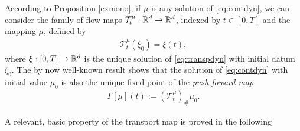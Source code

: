 According to  Proposition \ref{exmono}, if $\mu$ is any solution of \eqref{eq:contdyn}, we can consider the family of flow maps $\mathcal{T}^{\mu}_t:\mathbb{R}^d \rightarrow\mathbb{R}^d$, indexed by $t \in [0,T]$ and the mapping $\mu$, defined by
\begin{align*}
\mathcal{T}^{\mu}_t(\xi_0) = \xi(t),
\end{align*}
where $\xi:[0,T]\rightarrow\mathbb{R}^d$ is the unique solution of \eqref{eq:transpdyn} with initial datum $\xi_0$. The by now well-known result \cite[Theorem 3.10]{CanCarRos10} shows that the solution of \eqref{eq:contdyn} with initial value $\mu_0$ is also the unique fixed-point of the \textit{push-foward map}
\begin{align}\label{eq:fixedpoint}
\Gamma[\mu](t) := (\mathcal{T}^{\mu}_t)_{\#}\mu_0.
\end{align}

A relevant, basic property of the transport map is proved in the following

